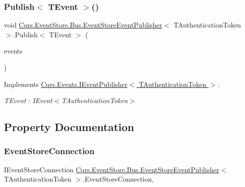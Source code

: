 \subsubsection{\texorpdfstring{Publish$<$ T\+Event $>$()}{Publish< TEvent >()}\hspace{0.1cm}{\footnotesize\ttfamily [2/2]}}
{\footnotesize\ttfamily void \hyperlink{classCqrs_1_1EventStore_1_1Bus_1_1EventStoreEventPublisher}{Cqrs.\+Event\+Store.\+Bus.\+Event\+Store\+Event\+Publisher}$<$ T\+Authentication\+Token $>$.Publish$<$ T\+Event $>$ (\begin{DoxyParamCaption}\item[{I\+Enumerable$<$ T\+Event $>$}]{events }\end{DoxyParamCaption})}



Implements \hyperlink{interfaceCqrs_1_1Events_1_1IEventPublisher_a2cbcc3d2c24d015abef6337714ec51ff_a2cbcc3d2c24d015abef6337714ec51ff}{Cqrs.\+Events.\+I\+Event\+Publisher$<$ T\+Authentication\+Token $>$}.

\begin{Desc}
\item[Type Constraints]\begin{description}
\item[{\em T\+Event} : {\em I\+Event$<$T\+Authentication\+Token$>$}]\end{description}
\end{Desc}


\subsection{Property Documentation}
\mbox{\label{classCqrs_1_1EventStore_1_1Bus_1_1EventStoreEventPublisher_a16df48a7203bc3bcde5f5a12f1d47934_a16df48a7203bc3bcde5f5a12f1d47934}} 
\subsubsection{\texorpdfstring{Event\+Store\+Connection}{EventStoreConnection}}
{\footnotesize\ttfamily I\+Event\+Store\+Connection \hyperlink{classCqrs_1_1EventStore_1_1Bus_1_1EventStoreEventPublisher}{Cqrs.\+Event\+Store.\+Bus.\+Event\+Store\+Event\+Publisher}$<$ T\+Authentication\+Token $>$.Event\+Store\+Connection\hspace{0.3cm}{\ttfamily [get]}, {\ttfamily [protected]}}

